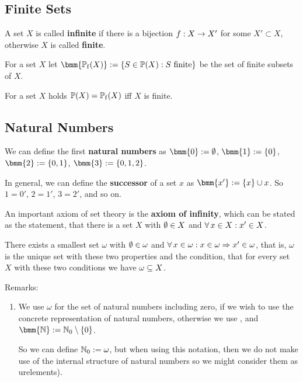 \documentclass[12pt]{book}
\begin{document}
\subsection{Finite Sets}
\label{sec:Finite sets}

\begin{defi}\label{def:finite}
      A set $X$ is called \textbf{infinite} if there is a bijection $f: X \rightarrow X'$ for some $X' \subset X$, otherwise $X$ is called \textbf{finite}.
\end{defi}
\begin{defi}\label{def:finitesubs}
      For a set $X$ let $\bmm{\pote(X)} := \set{S \in \pot(X) : S \text{ finite}}$ be the set of finite subsets of $X$.
\end{defi}
\begin{lem}\label{lem:finitesubs}
      For a set $X$ holds $\operatorname{\mathbb{P}}(X) = \operatorname{\mathbb{P}_f}(X)$ iff $X$ is finite.
\end{lem}
\subsection{Natural Numbers}
\label{sec:natnumbers}

\begin{defi}\label{def:natnumberssimple}
      We can define the first \textbf{natural numbers} as $\bmm{0} := \es$, $\bmm{1} := \set{0}$, $\bmm{2} := \set{0,1}$, $\bmm{3} := \set{0,1,2}$.
\end{defi}
	  \begin{defi}\label{def:successor}
      In general, we can define the \textbf{successor} of a set $x$ as $\bmm{x'} := \set{x} \cup x$. So $1 = 0'$, $2 = 1'$, $3 = 2'$, and so on.
\end{defi}
      An important axiom of set theory is the \textbf{axiom of infinity}, which can be stated as the statement, that there is a set $X$ with $\emptyset \in X$ 
	  and $\forall\, x \in X : x' \in X$.

\begin{lem}\label{lem:omega}
      There exists a smallest set $\omega$ with $\emptyset \in \omega$ and $\forall\, x \in \omega : x \in \omega \Rightarrow x' \in \omega$, that is, $\omega$ is 
	  the unique set with these two properties and the condition, that for every set $X$ with these two conditions we have $\omega \subseteq X$.
\end{lem}
Remarks:
\begin{enumerate}
      \item We use $\omega$ for the set of natural numbers including zero, if we wish to use the concrete representation of natural numbers, otherwise 
	  we use \bmm{\NNZ}, and $\bmm{\NN} := \NNZ \sm \set{0}$.

      So we can define $\mathbb{N}_0 := \omega$, but when using this notation, then we do not make use of the internal structure of natural numbers 
	  so we might consider them as urelements).
\end{enumerate}
\end{document}
